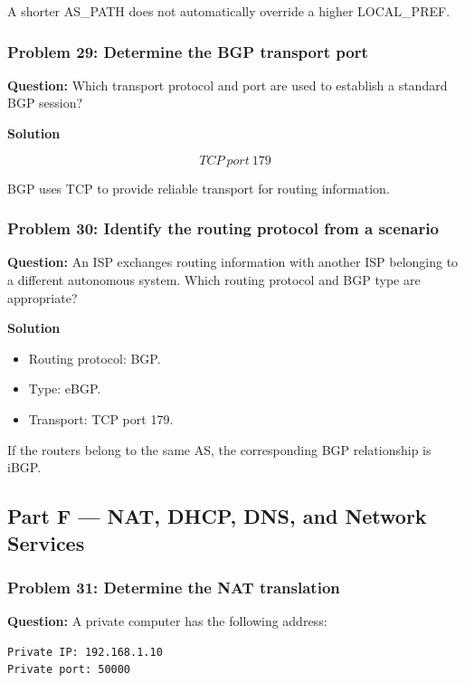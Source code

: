 A shorter AS\_PATH does not automatically override a higher LOCAL\_PREF.

\subsubsection*{Problem 29: Determine the BGP transport port}

\textbf{Question:} Which transport protocol and port are used to establish a standard BGP session?

\textbf{Solution}



\[
\boxed{TCP\ port\ 179}
\]



BGP uses TCP to provide reliable transport for routing information.

\subsubsection*{Problem 30: Identify the routing protocol from a scenario}

\textbf{Question:} An ISP exchanges routing information with another ISP belonging to a different autonomous system. Which routing protocol and BGP type are appropriate?

\textbf{Solution}

\begin{itemize}
\item Routing protocol: BGP.
\item Type: eBGP.
\item Transport: TCP port 179.
\end{itemize}

If the routers belong to the same AS, the corresponding BGP relationship is iBGP.

\subsection{Part F --- NAT, DHCP, DNS, and Network Services}
\subsubsection*{Problem 31: Determine the NAT translation}

\textbf{Question:} A private computer has the following address:

\begin{lstlisting}
Private IP: 192.168.1.10
Private port: 50000
\end{lstlisting}

